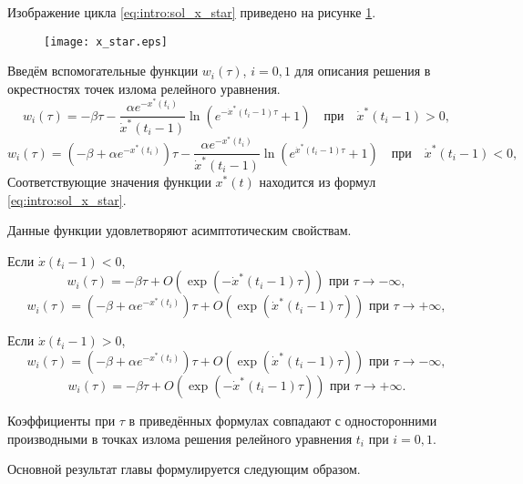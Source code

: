Изображение цикла \eqref{eq:intro:sol_x_star} приведено на рисунке \ref{fig:intro:x_star:ch1}.

\begin{figure}
	\centering
	\texttt{[image: x\_star.eps]}
	\label{fig:intro:x_star:ch1}
\end{figure}

Введём вспомогательные функции $w_i(\tau)$, $i = 0, 1$ для описания решения в окрестностях точек излома релейного уравнения.
\[
w_i(\tau) = -\beta \tau - \dfrac{\alpha e^{-x^*(t_i)}}{\dot{x}^*(t_i - 1)} \ln\left(e^{-\dot{x}^*(t_i - 1)\tau} + 1\right) \quad \text{при} \quad \dot{x}^*(t_i - 1) > 0,
\]
\[
w_i(\tau) = (-\beta + \alpha e^{-x^*(t_i)})\tau - \dfrac{\alpha e^{-x^*(t_i)}}{\dot{x}^*(t_i - 1)} \ln\left(e^{\dot{x}^*(t_i - 1)\tau} + 1\right) \quad \text{при} \quad \dot{x}^*(t_i - 1) < 0,
\]
Соответствующие значения функции $x^*(t)$ находится из формул \eqref{eq:intro:sol_x_star}.

Данные функции удовлетворяют асимптотическим свойствам.

Если $\dot{x}(t_i - 1) < 0$,
\begin{equation*}
	w_i(\tau) = -\beta \tau + O(\exp(-\dot{x}^*(t_i - 1) \tau)) \text{ при } \tau \to -\infty,
\end{equation*}
\begin{equation*}
	w_i(\tau) = (-\beta + \alpha e^{-x^*(t_i)})\tau + O(\exp(\dot{x}^*(t_i - 1) \tau)) \text{ при } \tau \to +\infty,
\end{equation*}

Если $\dot{x}(t_i - 1) > 0$,
\begin{equation*}
	w_i(\tau) = (-\beta + \alpha e^{-x^*(t_i)})\tau + O(\exp(\dot{x}^*(t_i - 1) \tau)) \text{ при } \tau \to -\infty,
\end{equation*}
\begin{equation*}
	w_i(\tau) = -\beta \tau + O(\exp(-\dot{x}^*(t_i - 1) \tau)) \text{ при } \tau \to +\infty.
\end{equation*}

Коэффициенты при $\tau$ в приведённых формулах совпадают с односторонними производными в точках излома решения релейного уравнения $t_i$ при $i = 0, 1$.

Основной результат главы формулируется следующим образом.

\bigskip

